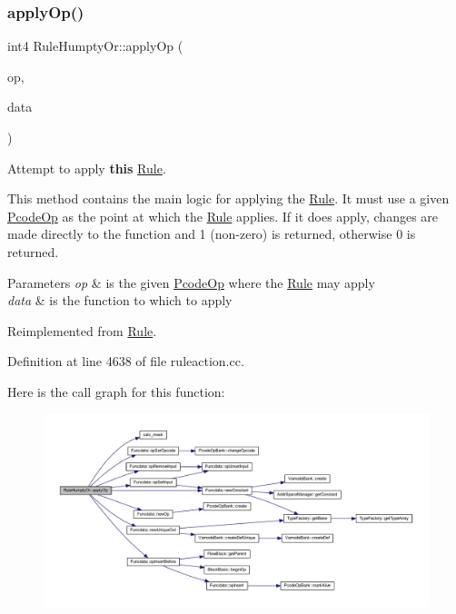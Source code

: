\subsubsection{\texorpdfstring{applyOp()}{applyOp()}}
{\footnotesize\ttfamily int4 Rule\+Humpty\+Or\+::apply\+Op (\begin{DoxyParamCaption}\item[{\mbox{\hyperlink{class_pcode_op}{Pcode\+Op}} $\ast$}]{op,  }\item[{\mbox{\hyperlink{class_funcdata}{Funcdata}} \&}]{data }\end{DoxyParamCaption})\hspace{0.3cm}{\ttfamily [virtual]}}



Attempt to apply {\bfseries{this}} \mbox{\hyperlink{class_rule}{Rule}}. 

This method contains the main logic for applying the \mbox{\hyperlink{class_rule}{Rule}}. It must use a given \mbox{\hyperlink{class_pcode_op}{Pcode\+Op}} as the point at which the \mbox{\hyperlink{class_rule}{Rule}} applies. If it does apply, changes are made directly to the function and 1 (non-\/zero) is returned, otherwise 0 is returned. 
\begin{DoxyParams}{Parameters}
{\em op} & is the given \mbox{\hyperlink{class_pcode_op}{Pcode\+Op}} where the \mbox{\hyperlink{class_rule}{Rule}} may apply \\
\hline
{\em data} & is the function to which to apply \\
\hline
\end{DoxyParams}


Reimplemented from \mbox{\hyperlink{class_rule_a4e3e61f066670175009f60fb9dc60848}{Rule}}.



Definition at line 4638 of file ruleaction.\+cc.

Here is the call graph for this function\+:
\nopagebreak
\begin{figure}[H]
\begin{center}
\leavevmode
\includegraphics[width=350pt]{class_rule_humpty_or_a247cf69f4d753d28a0bcaa14d8cf0abe_cgraph}
\end{center}
\end{figure}
\mbox{\label{class_rule_humpty_or_a7564110956850ec05005818ada05b515}} 
